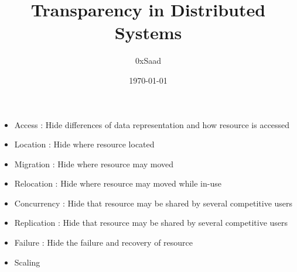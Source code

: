 \documentclass{article}
\title{Transparency in Distributed Systems}
\author{0xSaad}
\date{\today}
\begin{document}
\maketitle
\begin{itemize}
    \item Access : Hide differences of data representation and how resource is accessed
    \item Location : Hide where resource located
    \item Migration : Hide where resource may moved
    \item Relocation : Hide where resource may moved while in-use
    \item Concurrency : Hide that resource may be shared by several competitive users
    \item Replication : Hide that resource may be shared by several competitive users
    \item Failure : Hide the failure and recovery of resource
    \item Scaling


    
\end{itemize}
\end{document}
